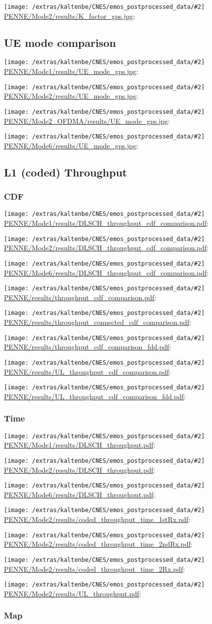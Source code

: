 \documentclass[a4paper,10pt]{article}
\newcommand{\printfile}[2][]{
 \begin{minipage}{8cm}
  \centering
  \texttt{[image: /extras/kaltenbe/CNES/emos\_postprocessed\_data/\#2]}
  \url{#2}: #1

 \end{minipage}
}
\begin{document}
\printfile{PENNE/Mode2/results/K_factor_gps.jpg}

\subsection{UE mode comparison}

\printfile{PENNE/Mode1/results/UE_mode_gps.jpg}
\printfile{PENNE/Mode2/results/UE_mode_gps.jpg}

\printfile{PENNE/Mode2_OFDMA/results/UE_mode_gps.jpg}
\printfile{PENNE/Mode6/results/UE_mode_gps.jpg}

\subsection{L1 (coded) Throughput}


\subsubsection{CDF}

\printfile{PENNE/Mode1/results/DLSCH_throughput_cdf_comparison.pdf}
\printfile{PENNE/Mode2/results/DLSCH_throughput_cdf_comparison.pdf}

\printfile{PENNE/Mode6/results/DLSCH_throughput_cdf_comparison.pdf}

\printfile{PENNE/results/throughput_cdf_comparison.pdf}
\printfile{PENNE/results/throughput_connected_cdf_comparison.pdf}

\printfile{PENNE/results/throughput_cdf_comparison_fdd.pdf}

\printfile{PENNE/results/UL_throughput_cdf_comparison.pdf}
\printfile{PENNE/results/UL_throughput_cdf_comparison_fdd.pdf}

\subsubsection{Time}

\printfile{PENNE/Mode1/results/DLSCH_throughput.pdf}
\printfile{PENNE/Mode2/results/DLSCH_throughput.pdf}

\printfile{PENNE/Mode6/results/DLSCH_throughput.pdf}
\printfile{PENNE/Mode2/results/coded_throughput_time_1stRx.pdf}

\printfile{PENNE/Mode2/results/coded_throughput_time_2ndRx.pdf}
\printfile{PENNE/Mode2/results/coded_throughput_time_2Rx.pdf}

\printfile{PENNE/Mode2/results/UL_throughput.pdf}


\subsubsection{Map}
\end{document}
